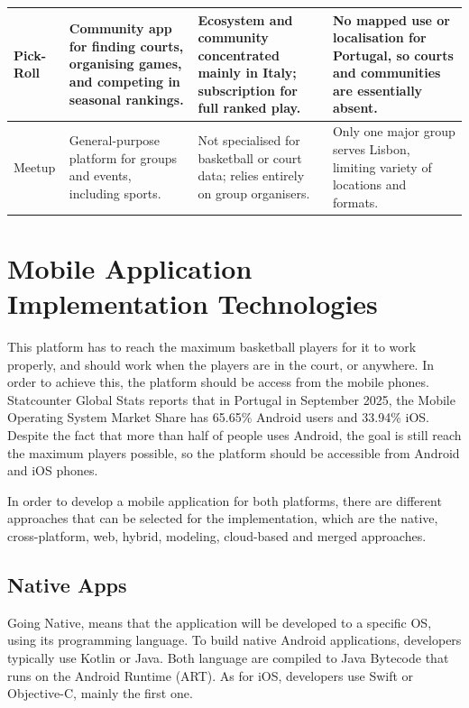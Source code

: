 \begin{table}[h]
\begin{tabularx}{\textwidth}{|p{2.4cm}|X|X|X|}
		Pick-Roll & Community app for finding courts, organising games, and competing in seasonal rankings. & Ecosystem and community concentrated mainly in Italy; subscription for full ranked play. & No mapped use or localisation for Portugal, so courts and communities are essentially absent. \\
		\hline
		
		Meetup & General-purpose platform for groups and events, including sports. & Not specialised for basketball or court data; relies entirely on group organisers. & Only one major group serves Lisbon, limiting variety of locations and formats. \\
		\hline
		
	\end{tabularx}
\end{table}


\section{Mobile Application Implementation Technologies}
This platform has to reach the maximum basketball players for it to work properly, and should work when the players are in the court, or anywhere. In order to achieve this, the platform should be access from the mobile phones. Statcounter Global Stats reports that in Portugal in September 2025, the Mobile Operating System Market Share has 65.65\% Android users and 33.94\% iOS\cite{statcount}. Despite the fact that more than half of people uses Android, the goal is still reach the maximum players possible, so the platform should be accessible from Android and iOS phones.

In order to develop a mobile application for both platforms, there are different approaches that can be selected for the implementation, which are the native, cross-platform, web, hybrid, modeling, cloud-based and merged approaches\cite{Khachouch2020}.

\subsection{Native Apps}\label{subsec:native-apps}

Going Native, means that the application will be developed to a specific OS, using its programming language. To build native Android applications, developers typically use Kotlin or Java. Both language are compiled to Java Bytecode that runs on the Android Runtime (ART). As for iOS, developers use Swift or Objective-C, mainly the first one.

